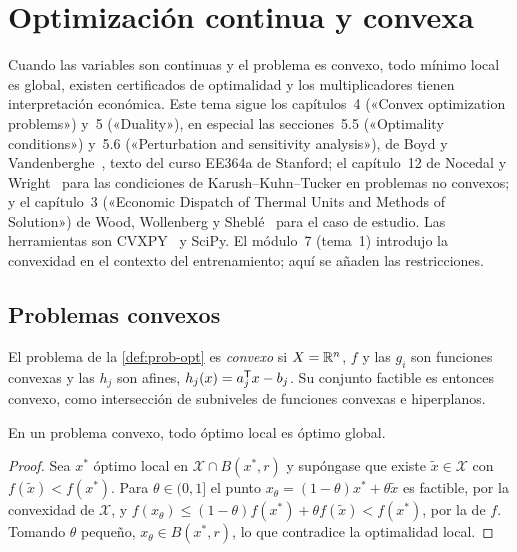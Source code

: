\chapter{Optimización continua y convexa}
\label{tema:4}

Cuando las variables son continuas y el problema es convexo, todo mínimo local es global, existen certificados de optimalidad y los multiplicadores tienen interpretación económica. Este tema sigue los capítulos~4 («Convex optimization problems») y~5 («Duality»), en especial las secciones~5.5 («Optimality conditions») y~5.6 («Perturbation and sensitivity analysis»), de Boyd y Vandenberghe~\cite{bv}, texto del curso EE364a de Stanford; el capítulo~12 de Nocedal y Wright~\cite{nw} para las condiciones de Karush--Kuhn--Tucker en problemas no convexos; y el capítulo~3 («Economic Dispatch of Thermal Units and Methods of Solution») de Wood, Wollenberg y Sheblé~\cite{wood} para el caso de estudio. Las herramientas son CVXPY~\cite{cvxpy,cvxpydoc} y SciPy. El módulo~7 (tema~1) introdujo la convexidad en el contexto del entrenamiento; aquí se añaden las restricciones.

\section{Problemas convexos}

\begin{definicion}\label{def:convexo}
El problema de la \cref{def:prob-opt} es \emph{convexo} si $X=\mathbb{R}^{n}$, $f$ y las $g_i$ son funciones convexas y las $h_j$ son afines, $h_j(x)=a_j^{\mathsf{T}} x-b_j$. Su conjunto factible es entonces convexo, como intersección de subniveles de funciones convexas e hiperplanos.
\end{definicion}

\begin{teorema}\label{teo:local-global}
En un problema convexo, todo óptimo local es óptimo global.
\end{teorema}

\begin{proof}
Sea $x^{*}$ óptimo local en $\mathcal{X}\cap B(x^{*},r)$ y supóngase que existe $\tilde x\in\mathcal{X}$ con $f(\tilde x)<f(x^{*})$. Para $\theta\in(0,1]$ el punto $x_\theta=(1-\theta)x^{*}+\theta\tilde x$ es factible, por la convexidad de $\mathcal{X}$, y $f(x_\theta)\le(1-\theta)f(x^{*})+\theta f(\tilde x)<f(x^{*})$, por la de $f$. Tomando $\theta$ pequeño, $x_\theta\in B(x^{*},r)$, lo que contradice la optimalidad local.
\end{proof}

